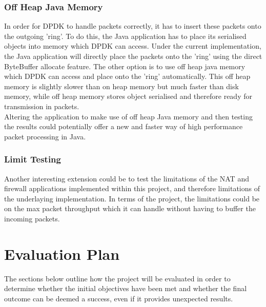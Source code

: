 \documentclass[a4paper, titlepage]{article}
\begin{document}
\subsubsection{Off Heap Java Memory}
In order for DPDK to handle packets correctly, it has to insert these packets onto the outgoing 'ring'. To do this, the Java application has to place its serialised objects into memory which DPDK can access. Under the current implementation, the Java application will directly place the packets onto the 'ring' using the direct ByteBuffer allocate feature. The other option is to use off heap java memory which DPDK can access and place onto the 'ring' automatically. This off heap memory is slightly slower than on heap memory but much faster than disk memory, while off heap memory stores object serialised and therefore ready for transmission in packets. \\
\newline
Altering the application to make use of off heap Java memory and then testing the results could potentially offer a new and faster way of high performance packet processing in Java.

\subsubsection{Limit Testing}
Another interesting extension could be to test the limitations of the NAT and firewall applications implemented within this project, and therefore limitations of the underlaying implementation. In terms of the project, the limitations could be on the max packet throughput which it can handle without having to buffer the incoming packets.

\newpage

\section{Evaluation Plan}
The sections below outline how the project will be evaluated in order to determine whether the initial objectives have been met and whether the final outcome can be deemed a success, even if it provides unexpected results.
\end{document}

